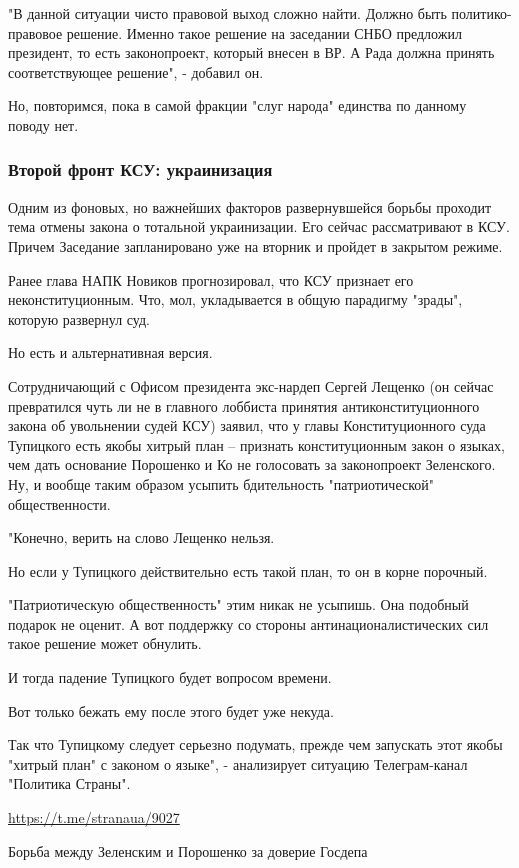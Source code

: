"В данной ситуации чисто правовой выход сложно найти. Должно быть
политико-правовое решение. Именно такое решение на заседании СНБО предложил
президент, то есть законопроект, который внесен в ВР. А Рада должна принять
соответствующее решение", - добавил он.

Но, повторимся, пока в самой фракции "слуг народа" единства по данному поводу
нет.

\subsubsection{Второй фронт КСУ: украинизация}

Одним из фоновых, но важнейших факторов развернувшейся борьбы проходит тема
отмены закона о тотальной украинизации. Его сейчас рассматривают в КСУ. Причем
Заседание запланировано уже на вторник и пройдет в закрытом режиме. 

Ранее глава НАПК Новиков прогнозировал, что КСУ признает его неконституционным.
Что, мол, укладывается в общую парадигму "зрады", которую развернул суд. 

Но есть и альтернативная версия.

Сотрудничающий с Офисом президента экс-нардеп Сергей Лещенко (он сейчас
превратился чуть ли не в главного лоббиста принятия антиконституционного закона
об увольнении судей КСУ) заявил, что у главы Конституционного суда Тупицкого
есть якобы хитрый план – признать конституционным закон о языках, чем дать
основание Порошенко и Ко не голосовать за законопроект Зеленского. Ну, и вообще
таким образом усыпить бдительность "патриотической" общественности.

"Конечно, верить на слово Лещенко нельзя.

Но если у Тупицкого действительно есть такой план, то он в корне порочный.

"Патриотическую общественность" этим никак не усыпишь. Она подобный подарок не
оценит. А вот поддержку со стороны антинационалистических сил такое решение
может обнулить.

И тогда падение Тупицкого будет вопросом времени.

Вот только бежать ему после этого будет уже некуда.

Так что Тупицкому следует серьезно подумать, прежде чем запускать этот якобы
"хитрый план" с законом о языке", - анализирует ситуацию Телеграм-канал
"Политика Страны".

\url{https://t.me/stranaua/9027}

Борьба между Зеленским и Порошенко за доверие Госдепа

